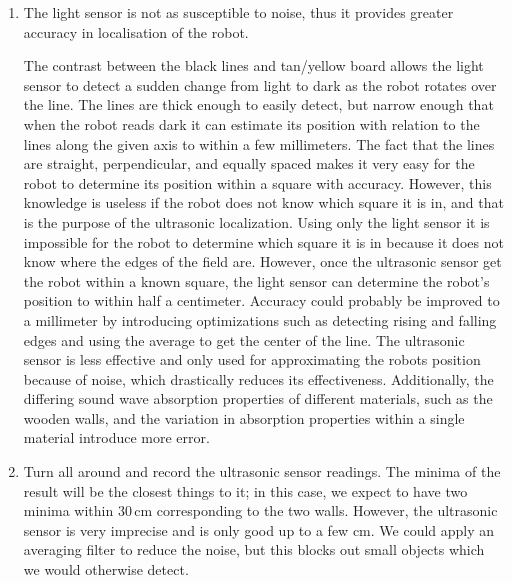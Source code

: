 \documentclass[twocolumn]{article}
\begin{document}
\begin{enumerate}
\item
The light sensor is not as susceptible to noise, thus it provides greater accuracy in localisation of the robot.

The contrast between the black lines and tan/yellow board allows the light sensor to detect a sudden change from light to dark as the robot rotates over the line. The lines are thick enough to easily detect, but narrow enough that when the robot reads dark it can estimate its position with relation to the lines along the given axis to within a few millimeters. The fact that the lines are straight, perpendicular, and equally spaced makes it very easy for the robot to determine its position within a square with accuracy. However, this knowledge is useless if the robot does not know which square it is in, and that is the purpose of the ultrasonic localization. Using only the light sensor it is impossible for the robot to determine which square it is in because it does not know where the edges of the field are. However, once the ultrasonic sensor get the robot within a known square, the light sensor can determine the robot’s position to within half a centimeter. Accuracy could probably be improved to a millimeter by introducing optimizations such as detecting rising and falling edges and using the average to get the center of the line. The ultrasonic sensor is less effective and only used for approximating the robots position because of noise, which drastically reduces its effectiveness. Additionally, the differing sound wave absorption properties of different materials, such as the wooden walls, and the variation in absorption properties within a single material introduce more error.

\item

Turn all around and record the ultrasonic sensor readings.
The minima of the result will be the closest things to it;
in this case, we expect to have two minima within 30\,cm corresponding
to the two walls. However, the ultrasonic sensor is very
imprecise and is only good up to a few cm. We could apply an averaging filter to reduce the noise, but this blocks out small objects which we would otherwise detect.


\end{enumerate}
\end{document}
